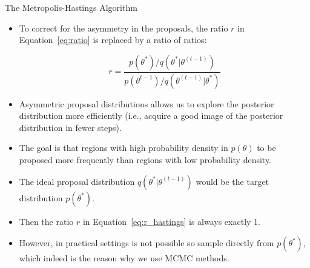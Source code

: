 \documentclass[handout]{beamer}
\begin{document}
\begin{frame}[fragile]{The Metropolis-Hastings Algorithm}
\scriptsize{

\begin{itemize}


\item To correct for the asymmetry in the proposals, the ratio $r$ in Equation~\ref{eq:ratio} is replaced by a ratio of ratios:

\begin{equation}\label{eq:r_hastings}
r = \frac{p(\theta^*)/q(\theta^{*}|\theta^{(t-1)})}{p(\theta^{t-1})/q(\theta^{(t-1)}|\theta^{*})}
\end{equation}




\item Asymmetric proposal distributions allows us to explore the posterior distribution more efficiently (i.e., acquire a good image of the posterior distribution in fewer steps).

\item The goal is that regions with high probability density in $p(\theta)$ to be proposed more frequently than regions with low probability density.

\item The ideal proposal distribution $q(\theta^{*}|\theta^{(t-1)})$ would be the target distribution $p(\theta^{*})$.

\item Then the ratio $r$ in Equation~\ref{eq:r_hastings} is always exactly 1.

\item However, in practical settings is not possible so sample directly from $p(\theta^{*})$, which indeed is the reason why we use MCMC methods.

\end{itemize}


}
\end{frame}
\end{document}
